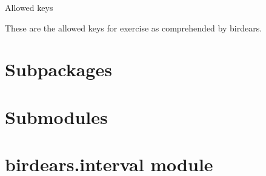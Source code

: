 \documentclass[letterpaper,10pt,english]{sphinxmanual}
\begin{document}

\begin{fulllineitems}
\label{\detokenize{index:birdears.KEYS}}
 \textendash{} Allowed keys

These are the allowed keys for exercise as comprehended by birdears.

\end{fulllineitems}



\section{Subpackages}
\label{\detokenize{index:subpackages}}

\section{Submodules}
\label{\detokenize{index:submodules}}

\section{birdears.interval module}
\label{\detokenize{index:birdears-interval-module}}\label{\detokenize{index:module-birdears.interval}}
\end{document}
